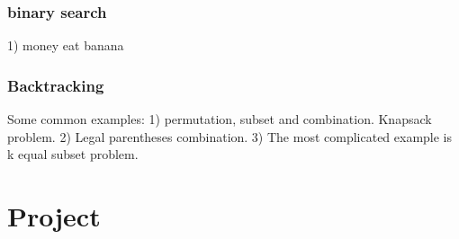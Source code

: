 \documentclass[a4paper,11pt,twoside]{book}
\begin{document}
\subsubsection{binary search}
	\par 1) money eat banana 
	
\subsubsection{Backtracking}

	\par Some common examples:  1) permutation, subset and combination. Knapsack problem. 2) Legal parentheses combination. 3) The most complicated example is k equal subset problem. 



\section{Project}
\end{document}
